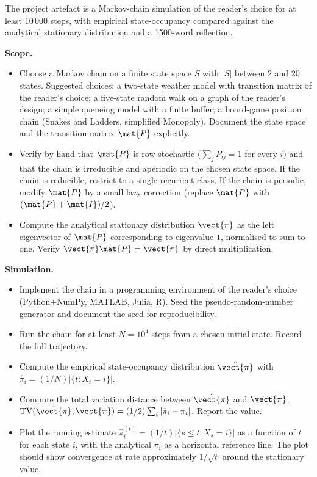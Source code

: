 \begin{project}
The project artefact is a
Markov-chain simulation of the reader's choice for at least
$10\,000$ steps, with empirical state-occupancy compared against
the analytical stationary distribution and a 1500-word reflection.

\textbf{Scope.}

\begin{itemize}[leftmargin=*]
  \item Choose a Markov chain on a finite state space $S$ with
    $|S|$ between $2$ and $20$ states. Suggested choices: a
    two-state weather model with transition matrix of the reader's
    choice; a five-state random walk on a graph of the reader's
    design; a simple queueing model with a finite buffer; a
    board-game position chain (Snakes and Ladders, simplified
    Monopoly). Document the state space and the transition matrix
    $\mat{P}$ explicitly.
  \item Verify by hand that $\mat{P}$ is row-stochastic
    ($\sum_{j} P_{ij} = 1$ for every $i$) and that the chain is
    irreducible and aperiodic on the chosen state space. If the
    chain is reducible, restrict to a single recurrent class. If
    the chain is periodic, modify $\mat{P}$ by a small lazy
    correction (replace $\mat{P}$ with $(\mat{P} + \mat{I})/2$).
  \item Compute the analytical stationary distribution
    $\vect{\pi}$ as the left eigenvector of $\mat{P}$ corresponding
    to eigenvalue $1$, normalised to sum to one. Verify
    $\vect{\pi} \mat{P} = \vect{\pi}$ by direct multiplication.
\end{itemize}

\textbf{Simulation.}

\begin{itemize}[leftmargin=*]
  \item Implement the chain in a programming environment of the
    reader's choice (Python+NumPy, MATLAB, Julia, R). Seed the
    pseudo-random-number generator and document the seed for
    reproducibility.
  \item Run the chain for at least $N = 10^{4}$ steps from a
    chosen initial state. Record the full trajectory.
  \item Compute the empirical state-occupancy distribution
    $\hat{\vect{\pi}}$ with $\hat\pi_{i} = (1/N) |\{t :
    X_{t} = i\}|$.
  \item Compute the total variation distance between
    $\hat{\vect{\pi}}$ and $\vect{\pi}$,
    $\mathrm{TV}(\hat{\vect{\pi}}, \vect{\pi}) =
    (1/2) \sum_{i} |\hat\pi_{i} - \pi_{i}|$. Report the value.
  \item Plot the running estimate $\hat\pi_{i}^{(t)} = (1/t)
    |\{s \leq t : X_{s} = i\}|$ as a function of $t$ for each
    state $i$, with the analytical $\pi_{i}$ as a horizontal
    reference line. The plot should show convergence at rate
    approximately $1/\sqrt{t}$ around the stationary value.
\end{itemize}


\end{project}
